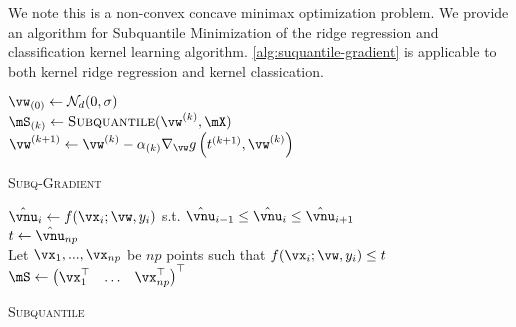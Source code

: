 \documentclass{article} %
\theoremstyle{plain}
\theoremstyle{definition}
\theoremstyle{remark}
\newcommand{\ccref}[1]{\textcolor{black}{\cref{#1}}}
\begin{document}
	We note this is a non-convex concave minimax optimization problem. 
	We provide an algorithm for Subquantile Minimization of the ridge regression and classification kernel learning algorithm. \ccref{alg:suquantile-gradient} is applicable to both kernel ridge regression and kernel classication.\\
	\begin{minipage}{0.48\textwidth}
		\begin{algorithm}[H]
			\DontPrintSemicolon
			$\vw_{(0)} \gets \mathcal{N}_{d}(0,\sigma)$\\
			{
				$\mS_{(k)} \gets \textsc{Subquantile}(\vw^{(k)},\mX)$\\
				$\vw^{(k+1)} \gets \vw^{(k)} - \alpha_{(k)}\nabla_\vw g\left(t^{(k+1)},\vw^{(k)}\right)$
			}
			\caption{\textsc{Subq-Gradient}}
			\label{alg:subq-gradient}
		\end{algorithm}
	\end{minipage}
	\hfill
	\begin{minipage}{0.48\textwidth}
		\begin{algorithm}[H]
			$\hat{\vnu}_i \gets f(\vx_i;\vw,y_i)$ s.t. $\hat{\vnu}_{i-1} \leq \hat{\vnu}_i \leq \hat{\vnu}_{i+1}$\\
			$t \gets \hat{\vnu}_{np}$\\
			Let $\vx_1,...,\vx_{np}$ be $np$ points such that $f(\vx_i;\vw,y_i) \leq t$\\
			$\mS \gets \begin{pmatrix} \vx_1^\top & \dots & \vx_{np}^\top\end{pmatrix}^\top$\\
			\KwRet{$ \mS $}
			\caption{\textsc{Subquantile}}
			\label{alg:subquantile}
		\end{algorithm}
	\end{minipage}
	
\end{document}
